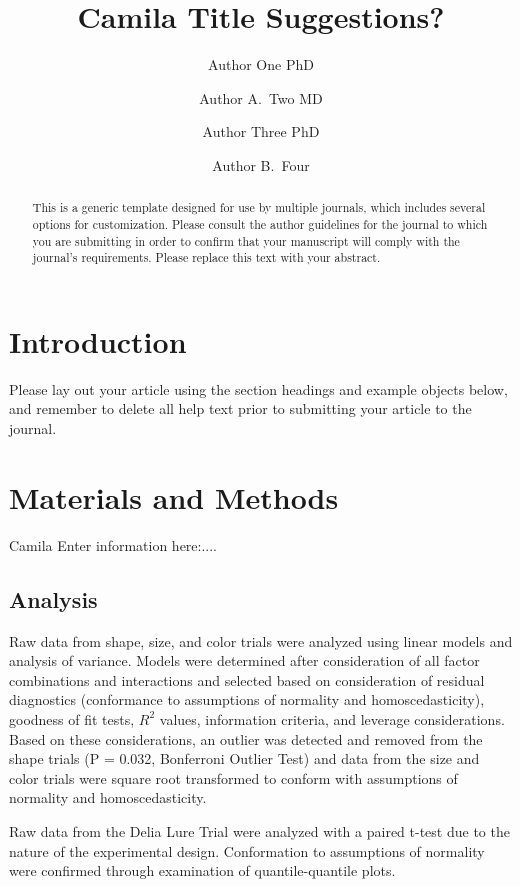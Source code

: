 \documentclass[alpha-refs]{wiley-article}
\title{Camila Title Suggestions?}
\author[1\authfn{1}]{Author One PhD}
\author[2\authfn{1}]{Author A.~Two MD}
\author[2\authfn{2}]{Author Three PhD}
\author[2]{Author B.~Four}
\affil[1]{Department, Institution, City, State or Province, Postal Code, Country}
\affil[2]{Department, Institution, City, State or Province, Postal Code, Country}
\begin{document}
\maketitle

\begin{abstract}
This is a generic template designed for use by multiple journals, which includes several options for customization. Please consult the author guidelines for the journal to which you are submitting in order to confirm that your manuscript will comply with the journal's requirements. Please replace this text with your abstract.

\end{abstract}

\section{Introduction}
Please lay out your article using the section headings and example objects below, and remember to delete all help text prior to submitting your article to the journal.


\section{Materials and Methods}

Camila Enter information here:....


\subsection{Analysis}

Raw data from shape, size, and color trials were analyzed using linear models and analysis of variance.  Models were determined after consideration of all factor combinations and interactions and selected based on consideration of residual diagnostics (conformance to assumptions of normality and homoscedasticity), goodness of fit tests, $R^2$ values, information criteria, and leverage considerations. Based on these considerations, an outlier was detected and removed from the shape trials (P = 0.032, Bonferroni Outlier Test) and data from the size and color trials were square root transformed to conform with assumptions of normality and homoscedasticity.    

Raw data from the Delia Lure Trial were analyzed with a paired t-test due to the nature of the experimental design.  Conformation to assumptions of normality were confirmed through examination of quantile-quantile plots.
\end{document}
